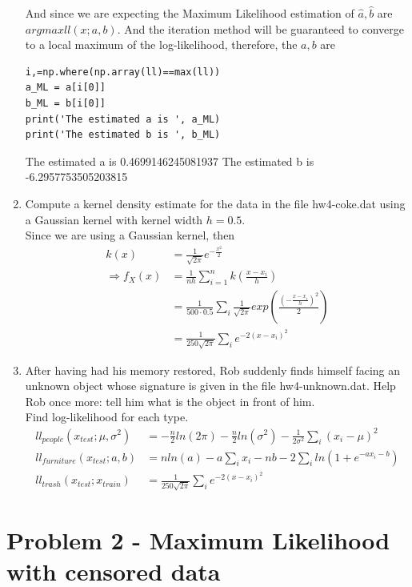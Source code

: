 \documentclass[preprint,12pt]{elsarticle}
\begin{document}
\begin{enumerate}
        And since we are expecting the Maximum Likelihood estimation of 
        $\hat{a},\hat{b}$ are $arg max ll(x;a,b)$. And the iteration method
        will be guaranteed to converge to a local maximum of the log-likelihood,
        therefore, the $a,b$ are
        \begin{lstlisting}
i,=np.where(np.array(ll)==max(ll))
a_ML = a[i[0]]
b_ML = b[i[0]]
print('The estimated a is ', a_ML)
print('The estimated b is ', b_ML)
        \end{lstlisting}

        \begin{spverbatim}
The estimated a is  0.4699146245081937
The estimated b is  -6.2957753505203815    
        \end{spverbatim}

        \item Compute a kernel density estimate for the data in the file
        hw4-coke.dat using a Gaussian kernel with kernel width $h=0.5$.\\

        Since we are using a Gaussian kernel, then
        \begin{align*}
            k(x) &= \frac{1}{\sqrt{2\pi}}e^{-\frac{x^2}{2}}\\
            \Rightarrow f_X(x) &= \frac{1}{nh}\sum_{i=1}^n k(\frac{x-x_i}{h}) \\
            &= \frac{1}{500\cdot 0.5}\sum_{i} \frac{1}{\sqrt{2\pi}} exp(\frac{(-\frac{x-x_i}{h})^2}{2})\\
            &= \frac{1}{250\sqrt{2\pi}}\sum_{i} e^{-2(x-x_i)^2}
        \end{align*}

        \item After having had his memory restored, Rob suddenly finds himself
        facing an unknown object whose signature is given in the file hw4-unknown.dat.
        Help Rob once more: tell him what is the object in front of him.\\

        Find log-likelihood for each type.
        \begin{align*}
            ll_{people}(x_{test}; \mu,\sigma^2) &= -\frac{n}{2}ln(2\pi) - \frac{n}{2}ln(\sigma^2) - \frac{1}{2\sigma^2}\sum_{i} (x_i - \mu)^2 \\
            ll_{furniture}(x_{test};a,b) &= nln(a) - a\sum_{i}x_i - nb - 2\sum_{i} ln(1+e^{-ax_i-b}) \\
            ll_{trash}(x_{test};x_{train}) &= \frac{1}{250\sqrt{2\pi}}\sum_{i} e^{-2(x-x_i)^2}
        \end{align*}



    \end{enumerate}

    \section{Problem 2 - Maximum Likelihood with censored data}
\end{document}

